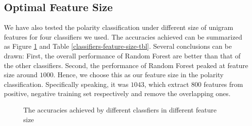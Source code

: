\documentclass[12pt]{article}
\begin{document}
\subsection{Optimal Feature Size}

We have also tested the polarity classification under different size of unigram features for four classifiers we used. The accuracies achieved can be summarized as Figure \ref{classifiers-feature-size} and Table \ref{classifiers-feature-size-tbl}. Several conclusions can be drawn: First, the overall performance of Random Forest are better than that of the other classifiers. Second, the performance of Random Forest peaked at feature size around $1000$. Hence, we choose this as our feature size in the polarity classification. Specifically speaking, it was $1043$, which extract $800$ features from positive, negative training set respectively and remove the overlapping ones.

\begin{figure}
\centering
\caption{The accuracies achieved by different classfiers in different feature size}
\label{classifiers-feature-size}
\end{figure}
\end{document}
